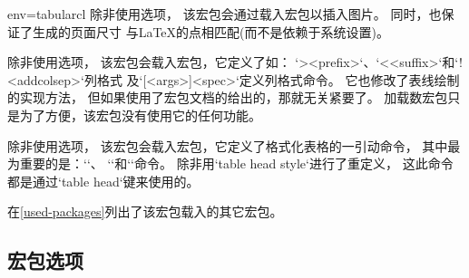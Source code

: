 \begin{tableobject}{env=tabular}{cl}
除非使用选项，
该宏包会通过载入宏包以插入图片。
同时，也保证了生成的页面尺寸
与\LaTeX{}的点相匹配(而不是依赖于系统设置)。

除非使用选项，
该宏包会载入宏包，它定义了如：
`>{<prefix>}`、`<{<suffix>}`和`!{<addcolsep>}`列格式
及`\newcolumntype{<col>}[<args>]{<spec>}`定义列格式命令。
它也修改了表线绘制的实现方法，
但如果使用了宏包文档的\autocite[第2节 ]{booktabs}给出的，那就无关紧要了。
加载数宏包只是为了方便，该宏包没有使用它的任何功能。

除非使用选项，
该宏包会载入宏包，它定义了格式化表格的一引动命令，
其中最为重要的是：`\toprule`、 `\midrule`和`\bottomrule`命令。
除非用`table head style`进行了重定义，
这此命令都是通过`table head`键来使用的。


在\cref{used-packages}列出了该宏包载入的其它宏包。


\subsection{宏包选项}
\label{package-options}


\end{tableobject}
